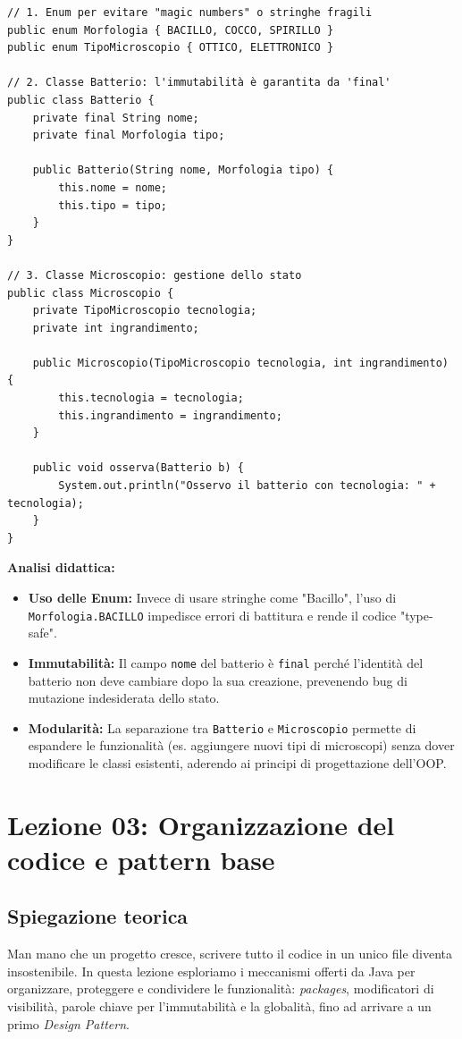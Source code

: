 \documentclass[12pt, a4paper]{article}
\begin{document}
\begin{verbatim}
// 1. Enum per evitare "magic numbers" o stringhe fragili
public enum Morfologia { BACILLO, COCCO, SPIRILLO }
public enum TipoMicroscopio { OTTICO, ELETTRONICO }

// 2. Classe Batterio: l'immutabilità è garantita da 'final'
public class Batterio {
    private final String nome;
    private final Morfologia tipo;

    public Batterio(String nome, Morfologia tipo) {
        this.nome = nome;
        this.tipo = tipo;
    }
}

// 3. Classe Microscopio: gestione dello stato
public class Microscopio {
    private TipoMicroscopio tecnologia;
    private int ingrandimento;

    public Microscopio(TipoMicroscopio tecnologia, int ingrandimento) {
        this.tecnologia = tecnologia;
        this.ingrandimento = ingrandimento;
    }

    public void osserva(Batterio b) {
        System.out.println("Osservo il batterio con tecnologia: " + tecnologia);
    }
}
\end{verbatim}

\textbf{Analisi didattica:}
\begin{itemize}
    \item \textbf{Uso delle Enum:} Invece di usare stringhe come "Bacillo", l'uso di \texttt{Morfologia.BACILLO} impedisce errori di battitura e rende il codice "type-safe".
    \item \textbf{Immutabilità:} Il campo \texttt{nome} del batterio è \texttt{final} perché l'identità del batterio non deve cambiare dopo la sua creazione, prevenendo bug di mutazione indesiderata dello stato.
    \item \textbf{Modularità:} La separazione tra \texttt{Batterio} e \texttt{Microscopio} permette di espandere le funzionalità (es. aggiungere nuovi tipi di microscopi) senza dover modificare le classi esistenti, aderendo ai principi di progettazione dell'OOP.
\end{itemize}

\newpage

\section{Lezione 03: Organizzazione del codice e pattern base}

\subsection{Spiegazione teorica}
Man mano che un progetto cresce, scrivere tutto il codice in un unico file diventa insostenibile. In questa lezione esploriamo i meccanismi offerti da Java per organizzare, proteggere e condividere le funzionalità: \textit{packages}, modificatori di visibilità, parole chiave per l'immutabilità e la globalità, fino ad arrivare a un primo \textit{Design Pattern}.
\end{document}
